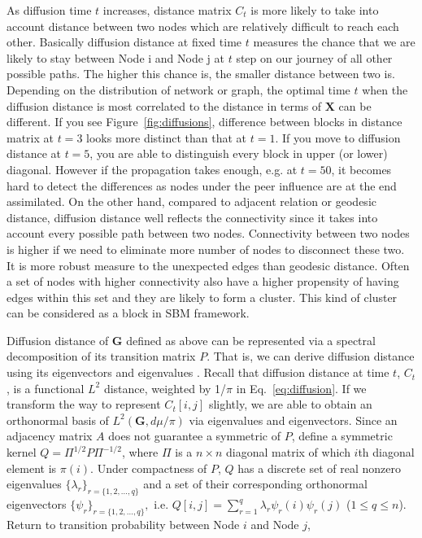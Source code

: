 \documentclass[12pt]{article}
\theoremstyle{definition}
\begin{document}
As diffusion time $t$ increases, distance matrix $C_{t}$ is more likely to take into account distance between two nodes which are relatively difficult to reach each other. Basically diffusion distance at fixed time $t$ measures the chance that we are likely to stay between Node i and Node j at $t$ step on our journey of all other possible paths. The higher this chance is, the smaller distance between two is. Depending on the distribution of network or graph, the optimal time $t$ when the diffusion distance is most correlated to the distance in terms of $\mathbf{X}$ can be different. If you see Figure~\ref{fig:diffusions}, difference between blocks in distance matrix at $t=3$ looks more distinct than that at $t=1$.  If you move to diffusion distance at $t=5$, you are able to distinguish every block in upper (or lower) diagonal. However if the propagation takes enough, e.g. at $t=50$, it becomes hard to detect the differences as nodes under the peer influence are at the end assimilated. On the other hand, compared to adjacent relation or geodesic distance, diffusion distance well reflects the connectivity since it takes into account every possible path between two nodes. Connectivity between two nodes is higher if we need to eliminate more number of nodes to disconnect these two. It is more robust measure to the unexpected edges than geodesic distance. Often a set of nodes with higher connectivity also have a higher propensity of having edges within this set and they are likely to form a cluster. This kind of cluster can be considered as a block in SBM framework. 
	
Diffusion distance of $\mathbf{G}$ defined as above can be represented via a spectral decomposition of its transition matrix $P$. That is, we can derive diffusion distance using its eigenvectors and eigenvalues \citep{coifman2006diffusion,lafon2006diffusion}. 
Recall that diffusion distance at time $t$, $C_{t}$, is a functional $L^2$ distance, weighted by 1/$\pi$ in Eq.~\ref{eq:diffusion}. If we transform the way to represent $C_{t}[i,j]$ slightly, we are able to obtain an orthonormal basis of $L^{2}(\mathbf{G}, d\mu / \pi)$ via eigenvalues and eigenvectors. 
Since an adjacency matrix $A$ does not guarantee a symmetric of $P$, define a symmetric kernel $Q = \Pi^{1/2} P \Pi^{-1/2}$, where $\Pi$ is a $n \times n$ diagonal matrix of which $i$th diagonal element is $\pi(i)$. Under compactness of $P$, $Q$ has a discrete set of real nonzero eigenvalues $\{ \lambda_{r} \}_{r = \{1,2,...,q \}}$ and a set of their corresponding orthonormal eigenvectors $\{ \psi_{r} \}_{r = \{1,2,..., q \} },$ i.e. $Q[i,j] = \sum\limits_{r=1}^{q} \lambda_{r} \psi_{r}(i) \psi_{r}(j)$ ($1 \leq q \leq n$).  Return to transition probability between Node $i$ and Node $j$,
\end{document}
